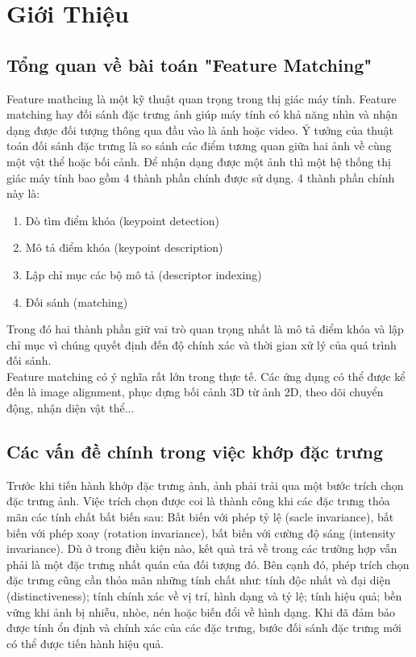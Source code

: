 \newpage
\section{Giới Thiệu}
\subsection{Tổng quan về bài toán "Feature Matching"}
Feature mathcing là một kỹ thuật quan trọng trong thị giác máy tính. Feature matching hay đối sánh đặc trưng ảnh giúp máy tính có khả năng nhìn và nhận dạng được đối tượng thông qua đầu vào là ảnh hoặc video. Ý tưởng của thuật toán đối sánh đặc trưng là so sánh các điểm tương quan giữa hai ảnh về cùng một vật thể hoặc bối cảnh. Để nhận dạng được một ảnh thì một hệ thống thị giác máy tính bao gồm 4 thành phần chính được sử dụng. 4 thành phần chính này là:

\begin{enumerate}
	\item Dò tìm điểm khóa (keypoint detection)
	\item Mô tả điểm khóa (keypoint description)
	\item Lập chỉ mục các bộ mô tả (descriptor indexing)
	\item Đối sánh (matching)
\end{enumerate}

Trong đó hai thành phần giữ vai trò quan trọng nhất là mô tả điểm khóa và lập chỉ mục vì chúng quyết định đến độ chính xác và thời gian xử lý của quá trình đối sánh.\\

Feature matching có ý nghĩa rất lớn trong thực tế. Các ứng dụng có thể được kể đến là image alignment, phục dựng bối cảnh 3D từ ảnh 2D, theo dõi chuyển động, nhận diện vật thể...

\subsection{Các vấn đề chính trong việc khớp đặc trưng}
Trước khi tiến hành khớp đặc trưng ảnh, ảnh phải trải qua một bước trích chọn đặc trưng ảnh. Việc trích chọn được coi là thành công khi các đặc trưng thỏa mãn các tính chất bất biến sau: Bất biến với phép tỷ lệ (sacle invariance), bất biến với phép xoay (rotation invariance), bất biến với cường độ sáng (intensity invariance). Dù ở trong điều kiện nào, kết quả trả về trong các trường hợp vẫn phải là một đặc trưng nhất quán của đối tượng đó. Bên cạnh đó, phép trích chọn đặc trưng cũng cần thỏa mãn những tính chất như: tính độc nhất và đại diện (distinctiveness); tính chính xác về vị trí, hình dạng và tỷ lệ; tính hiệu quả; bền vững khi ảnh bị nhiễu, nhòe, nén hoặc biến đổi về hình dạng. Khi đã đảm bảo được tính ổn định và chính xác của các đặc trưng, bước đối sánh đặc trưng mới có thể được tiến hành hiệu quả.\\

